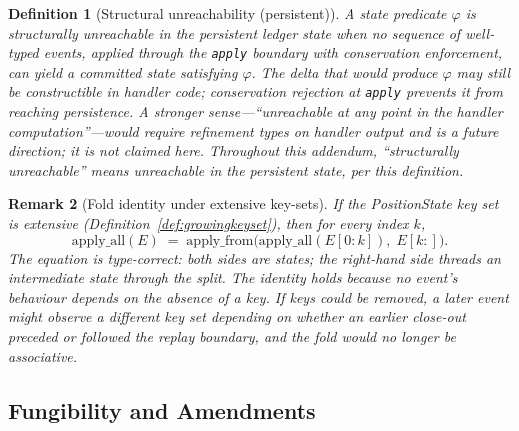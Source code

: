 \documentclass[11pt,a4paper]{article}
\newtheorem{definition}{Definition}[section]
\newtheorem{remark}[definition]{Remark}
\begin{document}
\begin{definition}[Structural unreachability (persistent)]
\label{def:structural}
A state predicate $\varphi$ is \emph{structurally unreachable in the persistent ledger state} when no sequence of well-typed events, applied through the \texttt{apply} boundary with conservation enforcement, can yield a committed state satisfying $\varphi$. The delta that would produce $\varphi$ may still be constructible in handler code; conservation rejection at \texttt{apply} prevents it from reaching persistence. A stronger sense---``unreachable at any point in the handler computation''---would require refinement types on handler output and is a future direction; it is not claimed here. Throughout this addendum, ``structurally unreachable'' means unreachable in the persistent state, per this definition.
\end{definition}

\begin{remark}[Fold identity under extensive key-sets]
\label{rem:foldidentity}
If the \textit{PositionState} key set is extensive (Definition~\ref{def:growingkeyset}), then for every index $k$,
\[
\mathrm{apply\_all}(E) \;=\; \mathrm{apply\_from}\bigl(\mathrm{apply\_all}(E[0{:}k]),\; E[k{:}]\bigr).
\]
The equation is type-correct: both sides are states; the right-hand side threads an intermediate state through the split. The identity holds because no event's behaviour depends on the \emph{absence} of a key. If keys could be removed, a later event might observe a different key set depending on whether an earlier close-out preceded or followed the replay boundary, and the fold would no longer be associative.
\end{remark}

\subsection{Fungibility and Amendments}
\end{document}
